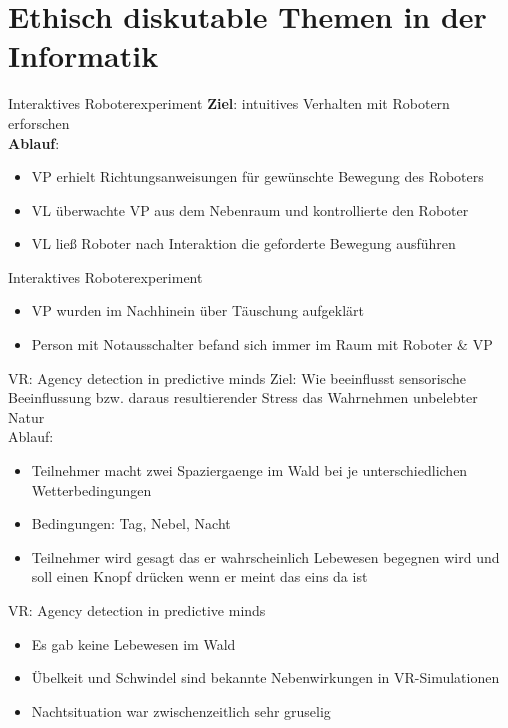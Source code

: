 \documentclass[10pt]{beamer}
\begin{document}
\section{Ethisch diskutable Themen in der Informatik}
	

	
	\begin{frame}{Interaktives Roboterexperiment}
		\textbf{Ziel}: intuitives Verhalten mit Robotern erforschen\\
		\vspace{0.8cm}
		\textbf{Ablauf}:
		\begin{itemize}
			\item VP erhielt Richtungsanweisungen für gewünschte Bewegung des Roboters
			\item VL überwachte VP aus dem Nebenraum und kontrollierte den Roboter
			\item VL ließ Roboter nach Interaktion die geforderte Bewegung ausführen
		\end{itemize}
	\end{frame}
	
	\begin{frame}{Interaktives Roboterexperiment}

		\begin{itemize}
			\item VP wurden im Nachhinein über Täuschung aufgeklärt
			\item Person mit Notausschalter befand sich immer im Raum mit Roboter \& VP
		\end{itemize}
	\end{frame}
	
	\begin{frame}{VR: Agency detection in predictive minds}
		Ziel: Wie beeinflusst sensorische Beeinflussung bzw. daraus resultierender Stress das Wahrnehmen unbelebter Natur \\
		Ablauf:
		\begin{itemize}
		\item Teilnehmer macht zwei Spaziergaenge im Wald bei je unterschiedlichen Wetterbedingungen
		\item Bedingungen: Tag, Nebel, Nacht
		\item Teilnehmer wird gesagt das er wahrscheinlich Lebewesen begegnen wird und soll einen Knopf drücken wenn er meint das eins da ist
		\end{itemize}
	\end{frame}
	
	
	\begin{frame}{VR: Agency detection in predictive minds}
		
		\begin{itemize}
			\item Es gab keine Lebewesen im Wald
			\item Übelkeit und Schwindel sind bekannte Nebenwirkungen in VR-Simulationen
			\item Nachtsituation war zwischenzeitlich sehr gruselig
		\end{itemize}
		
	\end{frame}
\end{document}
